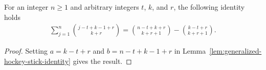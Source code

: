 \begin{lemma}
  \label{lem:backward-hockey-stick-identity}
  For an integer $n\geq1$ and arbitrary integers $t$, $k$, and $r$, the following identity holds
  \begin{align*}
    \sum_{j=1}^{n} \binom{j-t+k-1+r}{k+r}
    = \binom{n-t+k+r}{k+r+1} - \binom{k-t+r}{k+r+1}.
  \end{align*}
  \begin{proof}
    Setting $a=k-t+r$ and $b=n-t+k-1+r$ in
    Lemma~\eqref{lem:generalized-hockey-stick-identity} gives the result.
  \end{proof}
\end{lemma}
